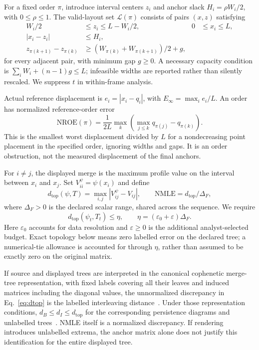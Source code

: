 \documentclass{vgtc}                %
\newcommand{\dtop}{d_{\mathrm{top}}}\newcommand{\nroe}{\mathrm{NROE}}
\begin{document}
For a fixed order $\pi$, introduce interval centers $z_i$ and anchor slack $H_i=\rho W_i/2$, with $0\le\rho\le1$. The valid-layout set $\mathcal{L}(\pi)$ consists of pairs $(x,z)$ satisfying
\begin{equation}\label{eq:layout}
\begin{aligned}
 W_i/2&\le z_i\le L-W_i/2, &0&\le x_i\le L,\\
 |x_i-z_i|&\le H_i,\\
 z_{\pi(k+1)}-z_{\pi(k)}&\ge
 (W_{\pi(k)}+W_{\pi(k+1)})/2+g,
\end{aligned}
\end{equation}
for every adjacent pair, with minimum gap $g\ge0$. A necessary capacity condition is $\sum_i W_i+(n-1)g\le L$; infeasible widths are reported rather than silently rescaled. We suppress $t$ in within-frame analysis.

Actual reference displacement is $e_i=|x_i-q_i|$, with $E_\infty=\max_i e_i/L$. An order has normalized reference-order error
\begin{equation}\label{eq:nroe}
 \nroe(\pi)=\frac{1}{2L}\max_k
 \left(\max_{j\le k}q_{\pi(j)}-q_{\pi(k)}\right).
\end{equation}
This is the smallest worst displacement divided by $L$ for a nondecreasing point placement in the specified order, ignoring widths and gaps. It is an order obstruction, not the measured displacement of the final anchors.

For $i\ne j$, the displayed merge is the maximum profile value on the interval between $x_i$ and $x_j$. Set $V_{ii}^{\psi}=\psi(x_i)$ and define
\begin{equation}\label{eq:dtop}
 \dtop(\psi,T)=\max_{i,j}|V_{ij}^{\psi}-V_{ij}|,
 \qquad\mathrm{NMLE}=\dtop/\Delta_F,
\end{equation}
where $\Delta_F>0$ is the declared scalar range, shared across the sequence. We require
\begin{equation}\label{eq:budget}
 \dtop(\psi_t,T_t)\le\eta,
 \qquad\eta=(\varepsilon_0+\varepsilon)\Delta_F.
\end{equation}
Here $\varepsilon_0$ accounts for data resolution and $\varepsilon\ge0$ is the additional analyst-selected budget. Exact topology below means zero labelled error on the declared tree; a numerical-tie allowance is accounted for through $\eta$, rather than assumed to be exactly zero on the original matrix.

If source and displayed trees are interpreted in the canonical cophenetic merge-tree representation, with fixed labels covering all their leaves and induced matrices including the diagonal values, the unnormalized discrepancy in Eq.~\ref{eq:dtop} is the labelled interleaving distance~\cite{Munch:2019:LINF,Gasparovic:2024:IID}. Under those representation conditions, $d_B\le d_I\le\dtop$ for the corresponding persistence diagrams and unlabelled trees~\cite{Gasparovic:2024:IID,Morozov:2013:IDMT}. NMLE itself is a normalized discrepancy. If rendering introduces unlabelled extrema, the anchor matrix alone does not justify this identification for the entire displayed tree.
\end{document}
